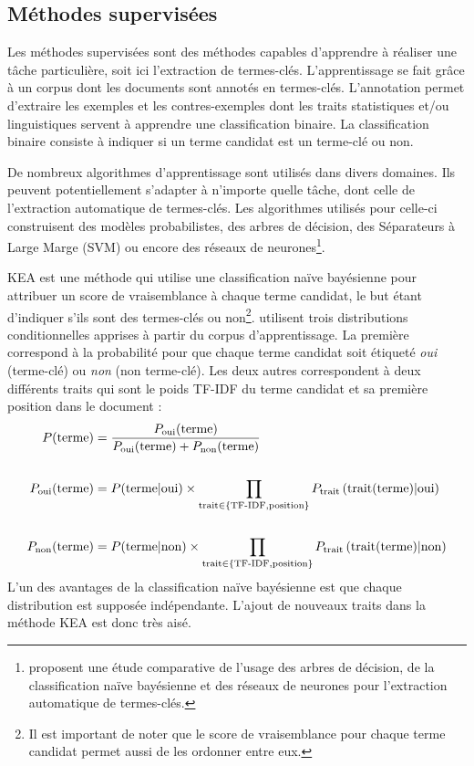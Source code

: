   \subsection{Méthodes supervisées}
  \label{sec:supervised_methods}
    Les méthodes supervisées sont des méthodes capables d'apprendre à réaliser
    une tâche particulière, soit ici l'extraction de termes-clés.
    L'apprentissage se fait grâce à un corpus dont les documents sont annotés en
    termes-clés. L'annotation permet d'extraire les exemples et les
    contres-exemples dont les traits statistiques et/ou linguistiques servent à
    apprendre une classification binaire. La classification binaire consiste à
    indiquer si un terme candidat est un terme-clé ou non.

    De nombreux algorithmes d'apprentissage sont utilisés dans divers domaines.
    Ils peuvent potentiellement s'adapter à n'importe quelle tâche, dont celle
    de l'extraction automatique de termes-clés. Les algorithmes utilisés pour
    celle-ci construisent des modèles probabilistes, des arbres de décision, des
    Séparateurs à Large Marge (SVM) ou encore des réseaux de
    neurones\footnote{\citet{sarkar2012machinelearningcomparison} proposent une
    étude comparative de l'usage des arbres de décision, de la classification
    naïve bayésienne et des réseaux de neurones pour l'extraction automatique de
    termes-clés.}.

    KEA \citep{witten1999kea} est une méthode qui utilise une classification
    naïve bayésienne pour attribuer un score de vraisemblance à chaque terme
    candidat, le but étant d'indiquer s'ils sont des termes-clés ou
    non\footnote{Il est important de noter que le score de vraisemblance pour
    chaque terme candidat permet aussi de les ordonner entre eux.}.
    \citet{witten1999kea} utilisent trois distributions conditionnelles apprises
    à partir du corpus d'apprentissage. La première correspond à la probabilité
    pour que chaque terme candidat soit étiqueté \textit{oui} (terme-clé) ou
    \textit{non} (non terme-clé). Les deux autres correspondent à deux
    différents traits qui sont le poids TF-IDF du terme candidat et sa première
    position dans le document :
    \begin{align}
      P(\text{terme}) &= \frac{P_{\text{oui}}(\text{terme})}{P_{\text{oui}}(\text{terme}) + P_{\text{non}}(\text{terme})} \label{math:kea}\\
      \notag\\
      P_{\text{oui}}(\text{terme}) &= P(\text{terme} | \text{oui}) \times \prod_{\text{trait} \in \{\text{TF-IDF}, \text{position}\}} P_{\text{trait}}\left(\text{trait}(\text{terme}) | \text{oui}\right) \notag\\
      \notag\\
      P_{\text{non}}(\text{terme}) &= P(\text{terme} | \text{non}) \times \prod_{\text{trait} \in \{\text{TF-IDF}, \text{position}\}} P_{\text{trait}}\left(\text{trait}(\text{terme}) | \text{non}\right) \notag
    \end{align}
    L'un des avantages de la classification naïve bayésienne est que chaque
    distribution est supposée indépendante. L'ajout de nouveaux traits dans la
    méthode KEA est donc très aisé.
    
